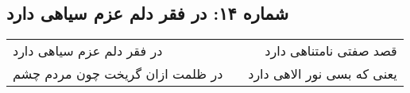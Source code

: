 \begin{center}
\section*{شماره ۱۴: در فقر دلم عزم سیاهی دارد}
\label{sec:014}
\begin{longtable}{l p{0.5cm} r}
در فقر دلم عزم سیاهی دارد
&&
قصد صفتی نامتناهی دارد
\\
در ظلمت ازان گریخت چون مردم چشم
&&
یعنی که بسی نور الاهی دارد
\\
\end{longtable}
\end{center}
